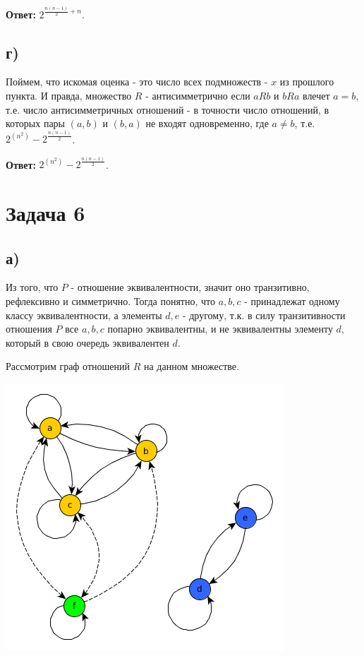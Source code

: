 \documentclass{article}
\begin{document}
	\textbf{Ответ:} $2^{\frac{n(n - 1)} {2} + n}$.
	
	  
	\subsection {г)}
	Поймем, что искомая оценка - это число всех подмножеств  - $x$ из прошлого пункта. И правда, множество $R$ - антисимметрично если $a R b$ и $b R a$ влечет $a = b$, т.е. число антисимметричных отношений - в точности число отношений, в которых пары $(a, b)$ и $(b, a)$ не входят одновременно, где $a \ne b$, т.е. $2^{(n^2)} - 2^{\frac{n(n - 1)} {2}}$.
	
	\textbf{Ответ: } $2^{(n^2)} - 2^{\frac{n(n - 1)} {2}}$.
	
	\section {Задача 6}
	\subsection {а)}
	Из того, что $P$ - отношение эквивалентности, значит оно транзитивно, рефлексивно и симметрично. Тогда понятно, что ${a, b, c}$ - принадлежат одному классу эквивалентности, а элементы ${d, e}$ - другому, т.к. в силу транзитивности отношения $P$ все $a, b, c$ попарно эквивалентны, и не эквивалентны элементу $d$, который в свою очередь эквивалентен $d$.
	
	Рассмотрим граф отношений $R$ на данном множестве.
	
	\includegraphics[scale=0.5]{6_1.png}
	
\end{document}
